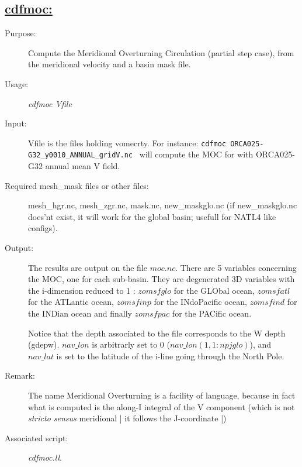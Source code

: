 \documentclass[a4paper,11pt]{article}
\begin{document}
\subsection*{\underline{cdfmoc:}}
\begin{description}
\item[Purpose:] Compute the Meridional Overturning Circulation (partial step case), from the meridional
velocity and a basin mask file.
\item[Usage:] {\em cdfmoc  Vfile }
\item[Input:] Vfile is the files holding vomecrty.
For instance: {\tt cdfmoc ORCA025-G32\_y0010\_ANNUAL\_gridV.nc }
will compute the MOC for with ORCA025-G32 annual mean V field.
\item[Required mesh\_mask files or other files:]   mesh\_hgr.nc, mesh\_zgr.nc, mask.nc, new\_maskglo.nc (if  new\_maskglo.nc does'nt exist, it will work for the global basin; usefull for NATL4 like configs).   \\
\item[Output:] The results are output on the file $moc.nc$. There are 5 variables concerning the MOC, one for each sub-basin. They are degenerated 3D variables with the i-dimension
reduced to 1 : $zomsfglo$ for the GLObal ocean,
$zomsfatl$ for the ATLantic ocean, $zomsfinp$ for the INdoPacific ocean, $zomsfind$ for the INDian ocean and finally
$zomsfpac$ for the PACific ocean. 

Notice that the depth associated to the file corresponds to the W depth (gdepw). $nav\_lon$ is arbitrarly set to 0 ($nav\_lon(1,1:npjglo)$),
and $nav\_lat$ is set to the latitude of the i-line going through the North Pole.
\item[Remark:]  The name Meridional Overturning is a facility of language, because in fact what is computed is the along-I integral
of the V component (which is not {\em stricto sensus} meridional | it follows the J-coordinate |)
\item[Associated script:] {\em cdfmoc.ll}.
\end{description}

\newpage
\end{document}
